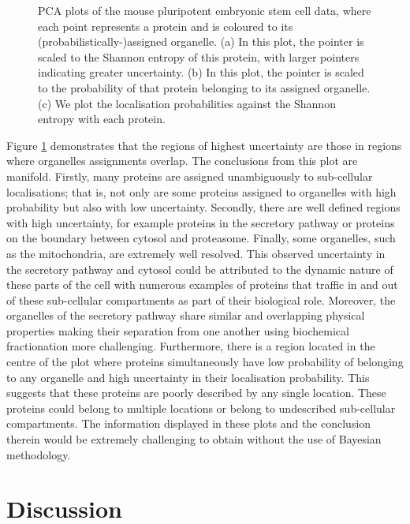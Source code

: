 \documentclass[12pt,english]{article}\usepackage[]{graphicx}\usepackage[]{color}
\newenvironment{knitrout}{}{} %
\begin{document}
\begin{figure}[p]
\begin{subfigure}[t]{0.5\textwidth}
\begin{knitrout}
{}



\end{knitrout}
    \caption{}
  \end{subfigure}

  \caption{PCA plots of the mouse pluripotent embryonic stem cell data, where
    each point represents a protein and is coloured
    to its (probabilistically-)assigned organelle. (a) In this plot, the pointer is
    scaled to the Shannon entropy of this protein, with
    larger pointers indicating greater uncertainty.
    (b) In this plot, the pointer is scaled to the probability
    of that protein belonging to its assigned organelle. (c) We plot
    the localisation probabilities against the Shannon entropy
    with each protein.}
  \label{figure:proteomeuncertainty}
 \end{figure}

Figure \ref{figure:proteomeuncertainty} demonstrates that the regions
of highest uncertainty are those in regions where organelles
assignments overlap. The conclusions from this plot are
manifold. Firstly, many proteins are assigned unambiguously to
sub-cellular localisations; that is, not only are some proteins
assigned to organelles with high probability but also with low
uncertainty. Secondly, there are well defined regions with high
uncertainty, for example proteins in the secretory pathway or proteins
on the boundary between cytosol and proteasome. Finally, some
organelles, such as the mitochondria, are extremely well
resolved. This observed uncertainty in the secretory pathway and
cytosol could be attributed to the dynamic nature of these parts of
the cell with numerous examples of proteins that traffic in and out of
these sub-cellular compartments as part of their biological
role. Moreover, the organelles of the secretory pathway share similar
and overlapping physical properties making their separation from one
another using biochemical fractionation more challenging.
Furthermore, there is a region located in the centre of the plot where
proteins simultaneously have low probability of belonging to any
organelle and high uncertainty in their localisation probability.
This suggests that these proteins are poorly described by any single
location. These proteins could belong to multiple locations or belong
to undescribed sub-cellular compartments. The information displayed in
these plots and the conclusion therein would be extremely challenging
to obtain without the use of Bayesian methodology.


\section*{Discussion}
\end{document}
